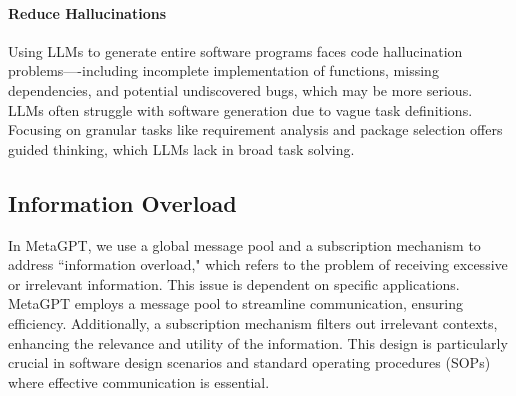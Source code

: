 \paragraph{Reduce Hallucinations} Using LLMs to generate entire software programs faces code hallucination problems—-including incomplete implementation of functions, missing dependencies, and potential undiscovered bugs, which may be more serious. %
LLMs often struggle with software generation due to vague task definitions. Focusing on granular tasks like requirement analysis and package selection offers guided thinking, which LLMs lack in broad task solving.


\subsection{Information Overload}
In MetaGPT, we use a global message pool and a subscription mechanism to address ``information overload," which refers to the problem of receiving excessive or irrelevant information. This issue is dependent on specific applications. MetaGPT employs a message pool to streamline communication, ensuring efficiency. Additionally, a subscription mechanism filters out irrelevant contexts, enhancing the relevance and utility of the information. This design is particularly crucial in software design scenarios and standard operating procedures (SOPs) where effective communication is essential.

\clearpage

